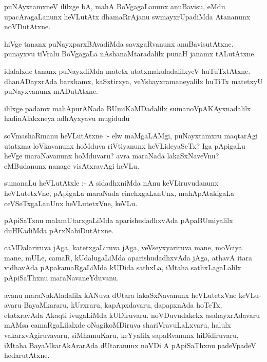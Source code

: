 \documentclass{article}
\begin{document}
\begin{mn}
puNAyxtamxneV ililxge bA,  mahA BoVgagaLanunx anuBavisu, eMdu upacAragaLanunx 
heVLutAtx dhamaRrAjanu swmayxrUpadiMda Atananunx noVDutAtxne.
\end{mn}

\begin{mn}
hiVge tananx puNayxparxBAvadiMda savxgaRvanunx anuBavisutAtxne. punayxvu 
tiVralu BoVgagaLa nAshanaMtaradalilx punaH janamx tALutAtxne.
\end{mn}

\begin{mn}
idalalxde tananx puNayxdiMda matetx  utatxmakuladalilxyeV huTuTxtAtxne. dhanADayxrAda 
barxhamx, kaSxtirxya, veYshayxramaneyalilx  huTiTx matetxyU puNayxvanunx mADutAtxne.
\end{mn}

\begin{mn}
ililxge padamx mahApurANada BUmiKaMDadalilx sumanoVpAKAyxnadalilx hadinAlakxneya 
adhAyxyavu mugidudu
\end{mn}


\begin{mn}
soVmashaRmanu heVLutAtxne :- elw maMgaLAMgi,  puNayxtamxru maqtarAgi utatxma 
loVkavanunx hoMduva riVtiyanunx heVLideyaSeTx? Iga pApigaLu heVge maraNavanunx  
hoMduvaru? avra maraNada lakaSxNaveVnu? eMBudanunx nanage  visAtxravAgi  heVLu.
\end{mn}

\begin{mn}
sumanaLu heVLutAtxle :- A sidadhxniMda nAnu keVLiruvudanunx heVLutetxVne, 
pApigaLa maraNada cinehxgaLanUnx, mahApAtakigaLa ceVSeTxgaLanUnx heVLutetxVne, keVLu.
\end{mn}

\begin{mn}
pApiSaTxnu  malamUtarxgaLiMda aparishudadhxvAda pApaBUmiyalilx duHKadiMda pArxNabiDutAtxne.
\end{mn}

\begin{mn}
caMDalariruva jAga, katetxgaLiruva jAga, veVseyxyariruva mane,  moVciya mane, 
mULe, camaR, kUdalugaLiMda aparishudadhxvAda jAga, athavA itara vidhavAda 
pApakamaRgaLiMda kUDida sathxLa,  iMtaha sathxLagaLalilx pApiSaThxnu maraNavaneYduvanu.
\end{mn}

\begin{mn}
avanu maraNakAladalilx kANuva dUtara lakaSxNavanunx heVLutetxVne keVLu-avaru 
BayaMkararu, kUrxraru,  kapApxdavaru, dapapxnAda hoTeTx, etatxravAda Akaqti 
ivugaLiMda  kUDiruvaru.  noVDuvudakekx asahayxrAdavaru  mAMsa camaRgaLilalxde oNagikoMDiruva  
shariVravuLaLxvaru,  halulx  vakarxvAgiruvavaru,  siMhamuKaru, keYyalilx 
sapaRvanunx hiDidiruvaru,  iMtaha BayaMkarAkArarAda dUtaranunx noVDi A pApiSaThxnu 
padeVpadeV hedarutAtxne.
\end{mn}
\end{document}
